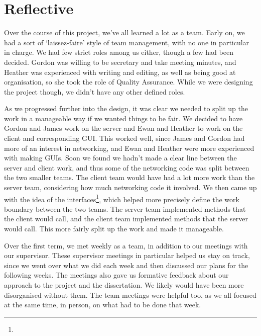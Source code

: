 \section{Reflective}
Over the course of this project, we've all learned a lot as a team. Early on, we had a sort of `laissez-faire' style of team management, with no one in particular in charge. We had few strict roles among us either, though a few had been decided. Gordon was willing to be secretary and take meeting minutes, and Heather was experienced with writing and editing, as well as being good at organisation, so she took the role of Quality Assurance. While we were designing the project though, we didn't have any other defined roles.

As we progressed further into the design, it was clear we needed to split up the work in a manageable way if we wanted things to be fair. We decided to have Gordon and James work on the server and Ewan and Heather to work on the client and corresponding GUI. This worked well, since James and Gordon had more of an interest in networking, and Ewan and Heather were more experienced with making GUIs. Soon we found we hadn't made a clear line between the server and client work, and thus some of the networking code was split between the two smaller teams. The client team would have had a lot more work than the server team, considering how much networking code it involved. We then came up with the idea of the interfaces\footnote{}, which helped more precisely define the work boundary between the two teams. The server team implemented methods that the client would call, and the client team implemented methods that the server would call. This more fairly split up the work and made it manageable.

Over the first term, we met weekly as a team, in addition to our meetings with our supervisor. These supervisor meetings in particular helped us stay on track, since we went over what we did each week and then discussed our plans for the following weeks. The meetings also gave us formative feedback about our approach to the project and the dissertation. We likely would have been more disorganised without them. The team meetings were helpful too, as we all focused at the same time, in person, on what had to be done that week.

